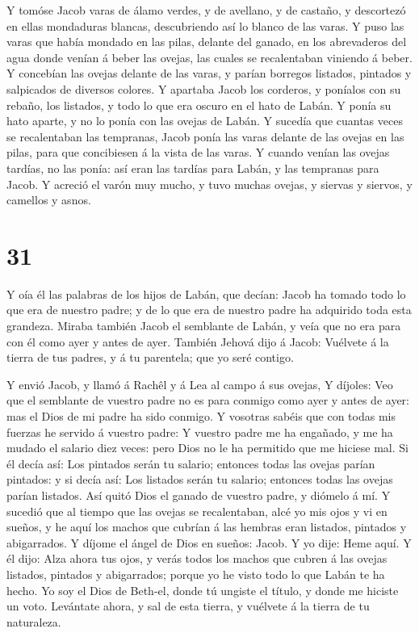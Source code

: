  Y tomóse Jacob varas de álamo verdes, y de avellano, y de
castaño, y descortezó en ellas mondaduras blancas, descubriendo así lo
blanco de las varas.  Y puso las varas que había mondado en
las pilas, delante del ganado, en los abrevaderos del agua donde venían
á beber las ovejas, las cuales se recalentaban viniendo á beber.
 Y concebían las ovejas delante de las varas, y parían
borregos listados, pintados y salpicados de diversos colores.
 Y apartaba Jacob los corderos, y poníalos con su rebaño,
los listados, y todo lo que era oscuro en el hato de Labán. Y ponía su
hato aparte, y no lo ponía con las ovejas de Labán.  Y
sucedía que cuantas veces se recalentaban las tempranas, Jacob ponía las
varas delante de las ovejas en las pilas, para que concibiesen á la
vista de las varas.  Y cuando venían las ovejas tardías, no
las ponía: así eran las tardías para Labán, y las tempranas para Jacob.
 Y acreció el varón muy mucho, y tuvo muchas ovejas, y
siervas y siervos, y camellos y asnos.

\hypertarget{section-30}{%
\section{31}\label{section-30}}

 Y oía él las palabras de los hijos de Labán, que decían:
Jacob ha tomado todo lo que era de nuestro padre; y de lo que era de
nuestro padre ha adquirido toda esta grandeza.  Miraba
también Jacob el semblante de Labán, y veía que no era para con él como
ayer y antes de ayer.  También Jehová dijo á Jacob: Vuélvete
á la tierra de tus padres, y á tu parentela; que yo seré contigo.

 Y envió Jacob, y llamó á Rachêl y á Lea al campo á sus
ovejas,  Y díjoles: Veo que el semblante de vuestro padre no
es para conmigo como ayer y antes de ayer: mas el Dios de mi padre ha
sido conmigo.  Y vosotras sabéis que con todas mis fuerzas
he servido á vuestro padre:  Y vuestro padre me ha engañado,
y me ha mudado el salario diez veces: pero Dios no le ha permitido que
me hiciese mal.  Si él decía así: Los pintados serán tu
salario; entonces todas las ovejas parían pintados: y si decía así: Los
listados serán tu salario; entonces todas las ovejas parían listados.
 Así quitó Dios el ganado de vuestro padre, y diómelo á mí.
 Y sucedió que al tiempo que las ovejas se recalentaban,
alcé yo mis ojos y vi en sueños, y he aquí los machos que cubrían á las
hembras eran listados, pintados y abigarrados.  Y díjome el
ángel de Dios en sueños: Jacob. Y yo dije: Heme aquí.  Y él
dijo: Alza ahora tus ojos, y verás todos los machos que cubren á las
ovejas listados, pintados y abigarrados; porque yo he visto todo lo que
Labán te ha hecho.  Yo soy el Dios de Beth-el, donde tú
ungiste el título, y donde me hiciste un voto. Levántate ahora, y sal de
esta tierra, y vuélvete á la tierra de tu naturaleza.

